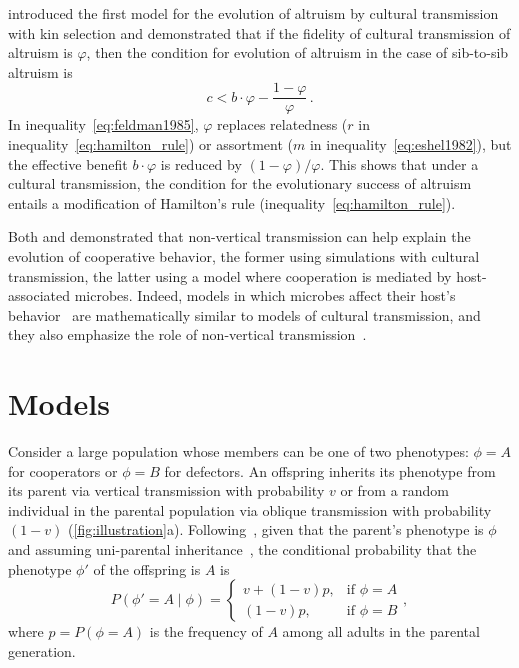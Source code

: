 \documentclass[12pt]{extarticle}
\begin{document}
\citet{feldman1985gene} introduced the first model for the evolution of altruism by cultural transmission with kin selection and demonstrated that if the fidelity of cultural transmission of altruism is $\varphi$, then the condition for evolution of altruism in the case of sib-to-sib altruism is \citep[Eq.~16]{feldman1985gene}
\begin{equation} \label{eq:feldman1985}
c < b \cdot \varphi - \frac{1-\varphi}{\varphi} \,.
\end{equation}
In inequality~\ref{eq:feldman1985}, $\varphi$ replaces relatedness ($r$ in inequality~\ref{eq:hamilton_rule}) or assortment ($m$ in inequality~\ref{eq:eshel1982}), but the effective benefit $b\cdot \varphi$ is  reduced by $(1-\varphi)/\varphi$.
This shows that under a cultural transmission, the condition for the evolutionary success of altruism entails a modification of Hamilton's rule (inequality~\ref{eq:hamilton_rule}).

Both \citet{woodcock2006significance} and \citet{lewin2017microbes} demonstrated that non-vertical transmission can help explain the evolution of cooperative behavior, the former using simulations with cultural transmission, the latter using a model where cooperation is mediated by host-associated microbes.
Indeed, models in which microbes affect their host's behavior~\citep{lewin2017microbes,lewin2020rockpaperscissors,gurevich2020parental} are mathematically similar to models of cultural transmission, and they also emphasize the role of non-vertical transmission~\citep{cavalli1981cultural}.
\newpage
\section{Models}

Consider a large population whose members can be one of two phenotypes: $\phi=A$ for cooperators or $\phi=B$ for defectors.
An offspring inherits its phenotype from its parent via vertical transmission with probability $v$ or from a random individual in the parental population via oblique transmission with probability $(1-v)$ (\autoref{fig:illustration}a). 
Following~\citet{ram2018evolution}, given that the parent's phenotype is $\phi$ and assuming uni-parental inheritance~\citep{Zefferman2016}, the conditional probability that the phenotype $\phi'$ of the offspring is $A$ is 
\begin{equation} \label{eq:vertical_oblique_transmission}
P(\phi'=A \mid \phi) = \begin{cases}
v + (1-v)p, & \text{if } \phi=A \\
(1-v)p, & \text{if } \phi=B
\end{cases},
\end{equation}
where $p=P(\phi=A)$ is the frequency of $A$ among all adults in the parental generation.  
\end{document}
